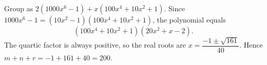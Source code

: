 Group as $2(1000x^6-1)+x(100x^4+10x^2+1)$. Since $1000x^6-1=(10x^2-1)(100x^4+10x^2+1)$, the polynomial equals
\[(100x^4+10x^2+1)(20x^2+x-2).\]
The quartic factor is always positive, so the real roots are $x=\dfrac{-1\pm\sqrt{161}}{40}$. Hence $m+n+r=-1+161+40=\boxed{200}$.
